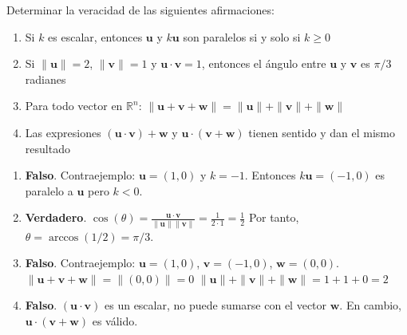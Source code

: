 \begin{prob}
Determinar la veracidad de las siguientes afirmaciones:

\begin{enumerate}[$(a)$]
\item Si $k$ es escalar, entonces $\mathbf{u}$ y $k\mathbf{u}$ son paralelos si y solo si $k \geq 0$
\item Si $\|\mathbf{u}\| = 2$, $\|\mathbf{v}\| = 1$ y $\mathbf{u} \cdot \mathbf{v} = 1$, entonces el ángulo entre $\mathbf{u}$ y $\mathbf{v}$ es $\pi/3$ radianes
\item Para todo vector en $\mathbb{R}^n$: $\|\mathbf{u} + \mathbf{v} + \mathbf{w}\| = \|\mathbf{u}\| + \|\mathbf{v}\| + \|\mathbf{w}\|$
\item Las expresiones $(\mathbf{u} \cdot \mathbf{v}) + \mathbf{w}$ y $\mathbf{u} \cdot (\mathbf{v} + \mathbf{w})$ tienen sentido y dan el mismo resultado
\end{enumerate}

\begin{myproof}
\begin{enumerate}[$(a)$]
\item \textbf{Falso}. Contraejemplo: $\mathbf{u} = (1,0)$ y $k = -1$. Entonces $k\mathbf{u} = (-1,0)$ es paralelo a $\mathbf{u}$ pero $k < 0$.

\item \textbf{Verdadero}. $\cos(\theta) = \frac{\mathbf{u} \cdot \mathbf{v}}{\|\mathbf{u}\|\|\mathbf{v}\|} = \frac{1}{2 \cdot 1} = \frac{1}{2}$
Por tanto, $\theta = \arccos(1/2) = \pi/3$.

\item \textbf{Falso}. Contraejemplo: $\mathbf{u} = (1,0)$, $\mathbf{v} = (-1,0)$, $\mathbf{w} = (0,0)$.
$\|\mathbf{u} + \mathbf{v} + \mathbf{w}\| = \|(0,0)\| = 0$
$\|\mathbf{u}\| + \|\mathbf{v}\| + \|\mathbf{w}\| = 1 + 1 + 0 = 2$

\item \textbf{Falso}. $(\mathbf{u} \cdot \mathbf{v})$ es un escalar, no puede sumarse con el vector $\mathbf{w}$. En cambio, $\mathbf{u} \cdot (\mathbf{v} + \mathbf{w})$ es válido.
\end{enumerate}
\end{myproof}
\end{prob}
